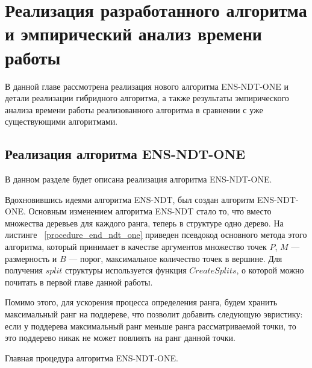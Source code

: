 \chapter{Реализация разработанного алгоритма и эмпирический анализ времени работы}
\label{chapter3}

В данной главе рассмотрена реализация нового алгоритма ENS-NDT-ONE и детали реализации гибридного алгоритма, а также результаты эмпирического анализа времени работы реализованного алгоритма в сравнении с уже существующими алгоритмами.

\section{Реализация алгоритма ENS-NDT-ONE}

В данном разделе будет описана реализация алгоритма ENS-NDT-ONE. 

Вдохновившись идеями алгоритма ENS-NDT, был создан алгоритм ENS-NDT-ONE. Основным изменением алгоритма ENS-NDT стало то, что вместо множества деревьев для каждого ранга, теперь в структуре одно дерево. На листинге ~\ref{procedure_end_ndt_one} приведен псевдокод основного метода этого алгоритма, который принимает в качестве аргументов множество точек $P$, $M$ {---} размерность и $B$ {---} порог, максимальное количество точек в вершине. Для получения $split$ структуры используется функция $CreateSplits$, о которой можно почитать в первой главе данной работы.

Помимо этого, для ускорения процесса определения ранга, будем хранить максимальный ранг на поддереве, что позволит добавить следующую эвристику: если у поддерева максимальный ранг меньше ранга рассматриваемой точки, то это поддерево никак не может повлиять на ранг данной точки. 

\begin{algorithm}
\begin{algorithmic}[1]
        \EndIf
    \EndFor
\EndProcedure
\end{algorithmic}
\caption{Главная процедура алгоритма ENS-NDT-ONE.}
\label{procedure_end_ndt_one}
\end{algorithm}

